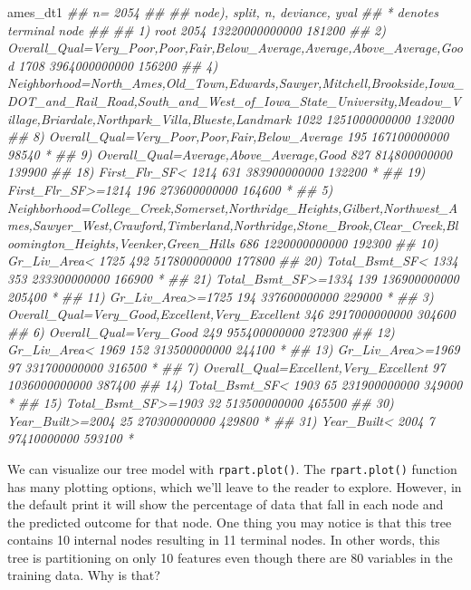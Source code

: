 \documentclass[]{krantz}
\makeatletter
\newenvironment{Shaded}{\begin{snugshade}}{\end{snugshade}}
\newcommand{\CommentTok}[1]{\textcolor[rgb]{0.37,0.37,0.37}{\textit{#1}}}
\newcommand{\NormalTok}[1]{#1}
\newenvironment{kframe}{%
\medskip{}
\setlength{\fboxsep}{.8em}
 \def\at@end@of@kframe{}%
 \ifinner\ifhmode%
  \def\at@end@of@kframe{\end{minipage}}%
  \begin{minipage}{\columnwidth}%
 \fi\fi%
 \def\FrameCommand##1{\hskip\@totalleftmargin \hskip-\fboxsep
 \colorbox{shadecolor}{##1}\hskip-\fboxsep
     \hskip-\linewidth \hskip-\@totalleftmargin \hskip\columnwidth}%
 \MakeFramed {\advance\hsize-\width
   \@totalleftmargin\z@ \linewidth\hsize
   \@setminipage}}%
 {\par\unskip\endMakeFramed%
 \at@end@of@kframe}
\renewenvironment{Shaded}{\begin{kframe}}{\end{kframe}}
\makeatother
\begin{document}
\begin{Shaded}
\begin{Highlighting}[]
\NormalTok{ames_dt1}
\CommentTok{## n= 2054 }
\CommentTok{## }
\CommentTok{## node), split, n, deviance, yval}
\CommentTok{##       * denotes terminal node}
\CommentTok{## }
\CommentTok{##  1) root 2054 13220000000000 181200  }
\CommentTok{##    2) Overall_Qual=Very_Poor,Poor,Fair,Below_Average,Average,Above_Average,Good 1708  3964000000000 156200  }
\CommentTok{##      4) Neighborhood=North_Ames,Old_Town,Edwards,Sawyer,Mitchell,Brookside,Iowa_DOT_and_Rail_Road,South_and_West_of_Iowa_State_University,Meadow_Village,Briardale,Northpark_Villa,Blueste,Landmark 1022  1251000000000 132000  }
\CommentTok{##        8) Overall_Qual=Very_Poor,Poor,Fair,Below_Average 195   167100000000  98540 *}
\CommentTok{##        9) Overall_Qual=Average,Above_Average,Good 827   814800000000 139900  }
\CommentTok{##         18) First_Flr_SF< 1214 631   383900000000 132200 *}
\CommentTok{##         19) First_Flr_SF>=1214 196   273600000000 164600 *}
\CommentTok{##      5) Neighborhood=College_Creek,Somerset,Northridge_Heights,Gilbert,Northwest_Ames,Sawyer_West,Crawford,Timberland,Northridge,Stone_Brook,Clear_Creek,Bloomington_Heights,Veenker,Green_Hills 686  1220000000000 192300  }
\CommentTok{##       10) Gr_Liv_Area< 1725 492   517800000000 177800  }
\CommentTok{##         20) Total_Bsmt_SF< 1334 353   233300000000 166900 *}
\CommentTok{##         21) Total_Bsmt_SF>=1334 139   136900000000 205400 *}
\CommentTok{##       11) Gr_Liv_Area>=1725 194   337600000000 229000 *}
\CommentTok{##    3) Overall_Qual=Very_Good,Excellent,Very_Excellent 346  2917000000000 304600  }
\CommentTok{##      6) Overall_Qual=Very_Good 249   955400000000 272300  }
\CommentTok{##       12) Gr_Liv_Area< 1969 152   313500000000 244100 *}
\CommentTok{##       13) Gr_Liv_Area>=1969 97   331700000000 316500 *}
\CommentTok{##      7) Overall_Qual=Excellent,Very_Excellent 97  1036000000000 387400  }
\CommentTok{##       14) Total_Bsmt_SF< 1903 65   231900000000 349000 *}
\CommentTok{##       15) Total_Bsmt_SF>=1903 32   513500000000 465500  }
\CommentTok{##         30) Year_Built>=2004 25   270300000000 429800 *}
\CommentTok{##         31) Year_Built< 2004 7    97410000000 593100 *}
\end{Highlighting}
\end{Shaded}

We can visualize our tree model with \texttt{rpart.plot()}. The \texttt{rpart.plot()} function has many plotting options, which we'll leave to the reader to explore. However, in the default print it will show the percentage of data that fall in each node and the predicted outcome for that node. One thing you may notice is that this tree contains 10 internal nodes resulting in 11 terminal nodes. In other words, this tree is partitioning on only 10 features even though there are 80 variables in the training data. Why is that?
\end{document}
